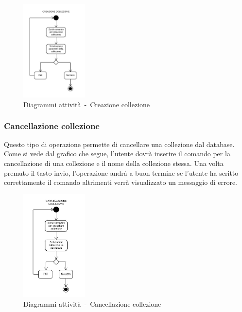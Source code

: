 \documentclass{scalatekids-article}
\begin{document}
\begin{figure}[H]
  \begin{center}
    \includegraphics[width=0.3\textwidth, keepaspectratio]{img/diagrammiAttivita/creazioneCollezione.jpeg}
    \caption{Diagrammi attività\ -\ Creazione collezione}
  \end{center}
\end{figure}

\subsubsection{Cancellazione collezione}

Questo tipo di operazione permette di cancellare una collezione dal database.
Come si vede dal grafico che segue, l'utente dovrà inserire il comando per la
cancellazione di una collezione e il nome della collezione stessa. Una volta
premuto il tasto invio, l'operazione andrà a buon termine se l'utente ha
scritto correttamente il comando altrimenti verrà visualizzato un messaggio di
errore.

\begin{figure}[H]
  \begin{center}
    \includegraphics[width=0.3\textwidth, keepaspectratio]{img/diagrammiAttivita/cancCollezione.jpeg}
    \caption{Diagrammi attività\ -\ Cancellazione collezione}
  \end{center}
\end{figure}
\end{document}
